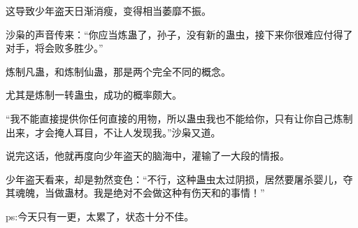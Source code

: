 \begin{this_body}
这导致少年盗天日渐消瘦，变得相当萎靡不振。

沙枭的声音传来：“你应当炼蛊了，孙子，没有新的蛊虫，接下来你很难应付得了对手，将会败多胜少。”

炼制凡蛊，和炼制仙蛊，那是两个完全不同的概念。

尤其是炼制一转蛊虫，成功的概率颇大。

“我不能直接提供你任何直接的用物，所以蛊虫我也不能给你，只有让你自己炼制出来，才会掩人耳目，不让人发现我。”沙枭又道。

说完这话，他就再度向少年盗天的脑海中，灌输了一大段的情报。

少年盗天看来，却是勃然变色：“不行，这种蛊虫太过阴损，居然要屠杀婴儿，夺其魂魄，当做蛊材。我是绝对不会做这种有伤天和的事情！”

ps:今天只有一更，太累了，状态十分不佳。

\end{this_body}

